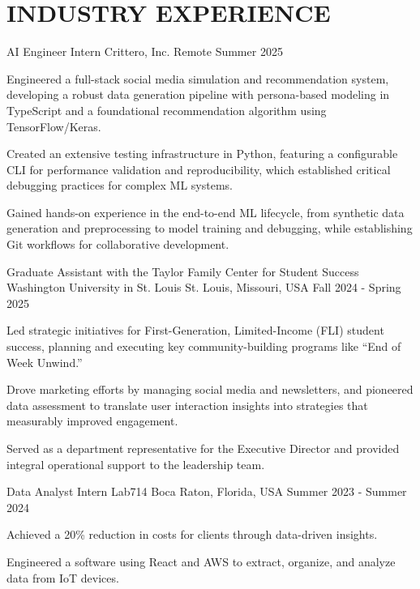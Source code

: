 \documentclass[10pt, letterpaper]{article}
\begin{document}
\section{INDUSTRY EXPERIENCE}

\begin{experienceentry}
  {AI Engineer Intern} %
  {Crittero, Inc.} %
  {Remote} %
  {Summer 2025} %
  \item Engineered a full-stack social media simulation and recommendation system, developing a robust data generation pipeline with persona-based modeling in TypeScript and a foundational recommendation algorithm using TensorFlow/Keras.
  \item Created an extensive testing infrastructure in Python, featuring a configurable CLI for performance validation and reproducibility, which established critical debugging practices for complex ML systems.
  \item Gained hands-on experience in the end-to-end ML lifecycle, from synthetic data generation and preprocessing to model training and debugging, while establishing Git workflows for collaborative development.
\end{experienceentry}

\begin{experienceentry}
  {Graduate Assistant with the Taylor Family Center for Student Success} %
  {Washington University in St. Louis} %
  {St. Louis, Missouri, USA} %
  {Fall 2024 - Spring 2025} %
  \item Led strategic initiatives for First-Generation, Limited-Income (FLI) student success, planning and executing key community-building programs like ``End of Week Unwind.''
  \item Drove marketing efforts by managing social media and newsletters, and pioneered data assessment to translate user interaction insights into strategies that measurably improved engagement.
  \item Served as a department representative for the Executive Director and provided integral operational support to the leadership team.
\end{experienceentry}

\begin{experienceentry}
  {Data Analyst Intern} %
  {Lab714} %
  {Boca Raton, Florida, USA} %
  {Summer 2023 - Summer 2024} %
  \item Achieved a 20\% reduction in costs for clients through data-driven insights.
  \item Engineered a software using React and AWS to extract, organize, and analyze data from IoT devices.
\end{experienceentry}
\end{document}
